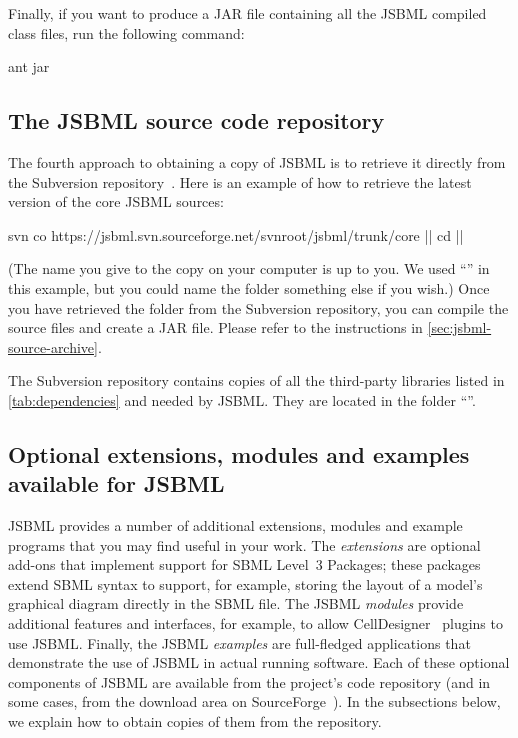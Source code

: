 Finally, if you want to produce a JAR file containing all the JSBML
compiled class files, run the following command:

\begin{example}[style=bash, title={Creating a JAR file.}]
ant jar
\end{example}



\subsection{The JSBML source code repository}
\label{sec:SourceDistribution}

The fourth approach to obtaining a copy of JSBML is to retrieve it directly
from the Subversion repository~\cite{JSBMLSVN}.  Here is an example of how
to retrieve the latest version of the core JSBML sources:

\newcommand{\dirname}{\code{\emph{\color{winered}jsbml}}\xspace}

\begin{example}[style=bash, title={Downloading the latest JSBML 
    sources from the JSBML project's Subversion repository.}]
svn co https://jsbml.svn.sourceforge.net/svnroot/jsbml/trunk/core |\dirname|
cd |\dirname|
\end{example}

(The name you give to the copy on your computer is up to you.  We used
``\dirname'' in this example, but you could name the folder something else
if you wish.)  Once you have retrieved the folder from the Subversion
repository, you can compile the source files and create a JAR file.  Please
refer to the instructions in \vref{sec:jsbml-source-archive}.

The Subversion repository contains copies of all the third-party libraries
listed in \vref{tab:dependencies} and needed by JSBML.  They are
located in the folder ``\dirname{}''.


\subsection{Optional extensions, modules and examples available for JSBML}
\label{sec:dependencies}

JSBML provides a number of additional extensions, modules and example
programs that you may find useful in your work.  The \emph{extensions} are
optional add-ons that implement support for SBML Level~3 Packages; these
packages extend SBML syntax to support, for example, storing the layout of
a model's graphical diagram directly in the SBML file.  The JSBML
\emph{modules} provide additional features and interfaces, for example, to
allow CellDesigner~\cite{Funahashi2003} plugins to use JSBML.  Finally, the
JSBML \emph{examples} are full-fledged applications that demonstrate the
use of JSBML in actual running software.  Each of these optional components
of JSBML are available from the project's code repository (and in some
cases, from the download area on SourceForge~\cite{JSBMLdownload}).  In the
subsections below, we explain how to obtain copies of them from the
repository.


